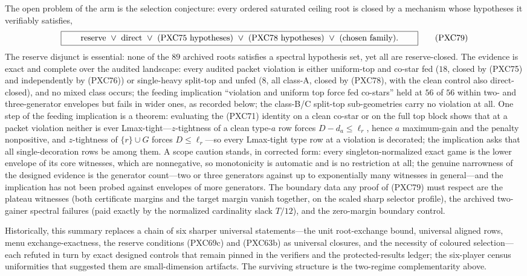 \documentclass[11pt]{article}
\begin{document}
The open problem of the arm is the selection conjecture: every ordered
saturated ceiling root is closed by a mechanism whose hypotheses it
verifiably satisfies,
\[
 \boxed{\qquad
 {\rm reserve}\ \vee\ {\rm direct}\ \vee\
 {\rm (PXC75\ hypotheses)}\ \vee\ {\rm (PXC78\ hypotheses)}\ \vee\
 {\rm (chosen\ family)}.
 \qquad}                                             \tag{PXC79}
\]
The reserve disjunct is essential: none of the $89$ archived roots
satisfies a spectral hypothesis set, yet all are reserve-closed.  The
evidence is exact and complete over the audited landscape: every audited
packet violation is either uniform-top and co-star fed ($18$, closed by
(PXC75) and independently by (PXC76)) or single-heavy split-top and
unfed ($8$, all class-A, closed by (PXC78), with the clean control also
direct-closed), and no mixed class occurs; the feeding implication
``violation and uniform top force fed co-stars'' held at $56$ of $56$
within two- and three-generator envelopes but fails in wider ones, as
recorded below;
the class-B/C split-top sub-geometries carry no violation at all.  One
step of the feeding implication is a theorem: evaluating the (PXC71)
identity on a clean co-star or on the full top block shows that at a
packet violation neither is ever Lmax-tight---$z$-tightness of a clean
type-$a$ row forces $D-d_a\le\ell_r$, hence $a$ maximum-gain and the
penalty nonpositive, and $z$-tightness of $\{r\}\cup G$ forces
$D\le\ell_r$---so every Lmax-tight type row at a violation is
decorated; the implication asks that all single-decoration rows be
among them.  A scope caution stands, in corrected form:
every singleton-normalized exact game is the lower envelope of its core
witnesses, which are nonnegative, so monotonicity is automatic and is no
restriction at all; the genuine narrowness of the designed evidence is
the generator count---two or three generators against up to
exponentially many witnesses in general---and the implication has not
been probed against envelopes of more generators.  The
boundary data any proof of (PXC79) must respect are the plateau
witnesses (both certificate margins and the target margin vanish
together, on the scaled sharp selector profile), the archived two-gainer
spectral failures (paid exactly by the normalized cardinality slack
$T/12$), and the zero-margin boundary control.

Historically, this summary replaces a chain of six sharper universal
statements---the unit root-exchange bound, universal aligned rows, menu
exchange-exactness, the reserve conditions (PXC69c) and (PXC63b) as
universal closures, and the necessity of coloured selection---each
refuted in turn by exact designed controls that remain pinned in the
verifiers and the protected-results ledger; the six-player census
uniformities that suggested them are small-dimension artifacts.  The
surviving structure is the two-regime complementarity above.
\end{document}

